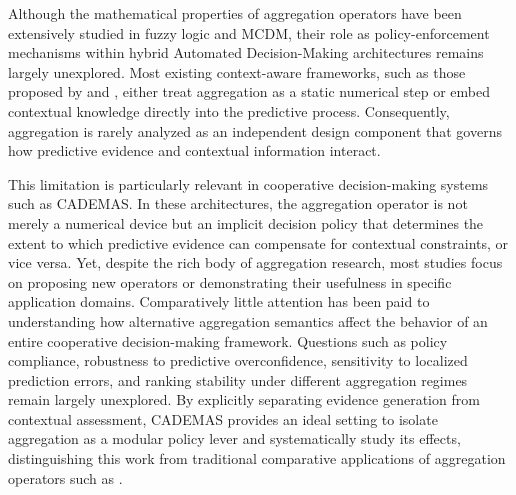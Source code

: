 \documentclass[mathematics,article,submit,moreauthors]{Definitions/mdpi}
\begin{document}
{\color{red}
Although the mathematical properties of aggregation operators have been extensively studied in fuzzy logic and MCDM, their role as policy-enforcement mechanisms within hybrid Automated Decision-Making architectures remains largely unexplored. Most existing context-aware frameworks, such as those proposed by \citet{Afzal2018} and \citet{Shyur2025}, either treat aggregation as a static numerical step or embed contextual knowledge directly into the predictive process. Consequently, aggregation is rarely analyzed as an independent design component that governs how predictive evidence and contextual information interact.

This limitation is particularly relevant in cooperative decision-making systems such as CADEMAS. In these architectures, the aggregation operator is not merely a numerical device but an implicit decision policy that determines the extent to which predictive evidence can compensate for contextual constraints, or vice versa. Yet, despite the rich body of aggregation research, most studies focus on proposing new operators or demonstrating their usefulness in specific application domains. Comparatively little attention has been paid to understanding how alternative aggregation semantics affect the behavior of an entire cooperative decision-making framework. Questions such as policy compliance, robustness to predictive overconfidence, sensitivity to localized prediction errors, and ranking stability under different aggregation regimes remain largely unexplored. By explicitly separating evidence generation from contextual assessment, CADEMAS provides an ideal setting to isolate aggregation as a modular policy lever and systematically study its effects, distinguishing this work from traditional comparative applications of aggregation operators such as \citet{Blancas2024}.
}

\end{document}
